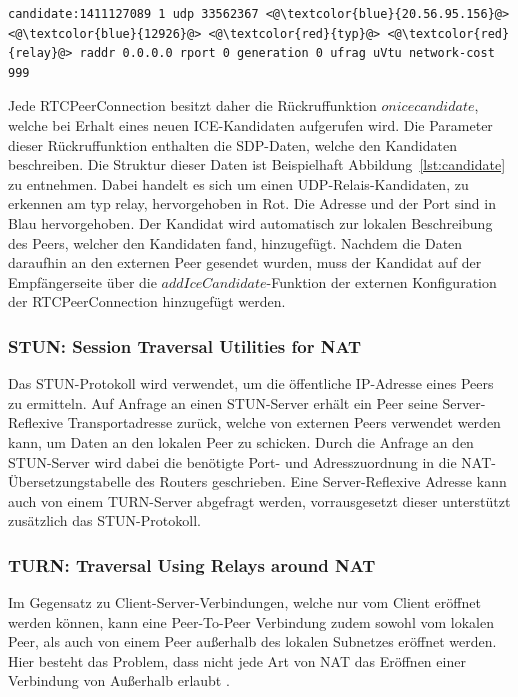 \vspace{1pc}
\lstset{style=STYLE_ICE_CANDIDATE_0}
\begin{lstlisting}[caption={SDP-Datenstring eines Relais-ICE-Kandidaten},captionpos=b,label={lst:candidate}]
candidate:1411127089 1 udp 33562367 <@\textcolor{blue}{20.56.95.156}@> <@\textcolor{blue}{12926}@> <@\textcolor{red}{typ}@> <@\textcolor{red}{relay}@> raddr 0.0.0.0 rport 0 generation 0 ufrag uVtu network-cost 999
\end{lstlisting}

Jede RTCPeerConnection besitzt daher die Rückruffunktion \glqq{}$onicecandidate$\grqq{}, welche bei Erhalt eines neuen \acs{ICE}-Kandidaten aufgerufen wird. Die Parameter dieser Rückruffunktion enthalten die \acs{SDP}-Daten, welche den Kandidaten beschreiben. Die Struktur dieser Daten ist Beispielhaft Abbildung~\ref{lst:candidate} zu entnehmen. Dabei handelt es sich um einen \acs{UDP}-Relais-Kandidaten, zu erkennen am \glqq{}typ relay\grqq{}, hervorgehoben in Rot. Die Adresse und der Port sind in Blau hervorgehoben. Der Kandidat wird automatisch zur lokalen Beschreibung des Peers, welcher den Kandidaten fand, hinzugefügt. Nachdem die Daten daraufhin an den externen Peer gesendet wurden, muss der Kandidat auf der Empfängerseite über die $addIceCandidate$-Funktion der externen Konfiguration der RTCPeerConnection hinzugefügt werden.

\subsubsection{STUN: Session Traversal Utilities for NAT}
Das \acf{STUN}-Protokoll wird verwendet, um die öffentliche \acs{IP}-Adresse eines Peers zu ermitteln. Auf Anfrage an einen STUN-Server erhält ein Peer seine Server-Reflexive Transportadresse zurück, welche von externen Peers verwendet werden kann, um Daten an den lokalen Peer zu schicken. Durch die Anfrage an den \acs{STUN}-Server wird dabei die benötigte Port- und Adresszuordnung in die \acs{NAT}-Übersetzungstabelle des Routers geschrieben. Eine Server-Reflexive Adresse kann auch von einem TURN-Server abgefragt werden, vorrausgesetzt dieser unterstützt zusätzlich das \acs{STUN}-Protokoll.\par

\subsubsection{TURN: Traversal Using Relays around NAT}
Im Gegensatz zu Client-Server-Verbindungen, welche nur vom Client eröffnet werden können, kann eine Peer-To-Peer Verbindung zudem sowohl vom lokalen Peer, als auch von einem Peer außerhalb des lokalen Subnetzes eröffnet werden. Hier besteht das Problem, dass nicht jede Art von \acs{NAT} das Eröffnen einer Verbindung von Außerhalb erlaubt \cite{natproblemsRFC}.\par

